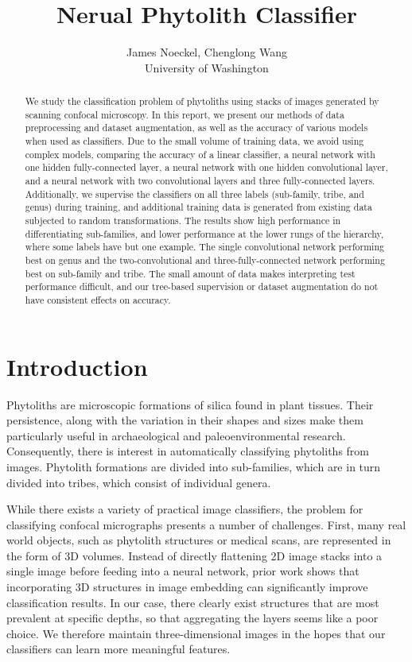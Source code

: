 \documentclass{article}
\title{Nerual Phytolith Classifier}
\author{
  James Noeckel, Chenglong Wang\\
  University of Washington
}
\begin{document}

\maketitle

\begin{abstract}
  We study the classification problem of phytoliths using stacks of images generated by scanning confocal microscopy. In this report, we present our methods of data preprocessing and dataset augmentation, as well as the accuracy of various models when used as classifiers. Due to the small volume of training data, we avoid using complex models, comparing the accuracy of a linear classifier, a neural network with one hidden fully-connected layer, a neural network with one hidden convolutional layer, and a neural network with two convolutional layers and three fully-connected layers. Additionally, we supervise the classifiers on all three labels (sub-family, tribe, and genus) during training, and additional training data is generated from existing data subjected to random transformations. The results show high performance in differentiating sub-families, and lower performance at the lower rungs of the hierarchy, where some labels have but one example. The single convolutional network performing best on genus and the two-convolutional and three-fully-connected network performing best on sub-family and tribe. The small amount of data makes interpreting test performance difficult, and our tree-based supervision or dataset augmentation do not have consistent effects on accuracy.
\end{abstract}

\section{Introduction}


Phytoliths are microscopic formations of silica found in plant tissues. Their persistence, along with the variation in their shapes and sizes make them particularly useful in archaeological and paleoenvironmental research. Consequently, there is interest in automatically classifying phytoliths from images. Phytolith formations are divided into sub-families, which are in turn divided into tribes, which consist of individual genera.

While there exists a variety of practical image classifiers, the problem for classifying confocal micrographs presents a number of challenges. First, many real world objects, such as phytolith structures or medical scans, are represented in the form of 3D volumes. Instead of directly flattening 2D image stacks into a single image before feeding into a neural network, prior work shows that incorporating 3D structures in image embedding can significantly improve classification results.  In our case, there clearly exist structures that are most prevalent at specific depths, so that aggregating the layers seems like a poor choice. We therefore maintain three-dimensional images in the hopes that our classifiers can learn more meaningful features.
\end{document}
